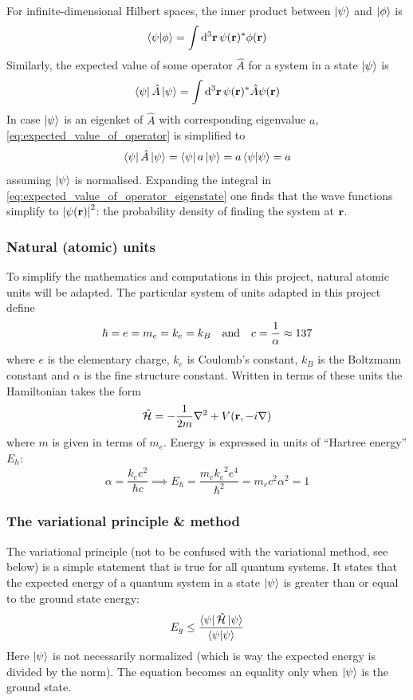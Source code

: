 \documentclass[nofootinbib,reprint,english]{revtex4-1}
\newcommand{\hatHH}{\hat{\mathcal{H}}}
\begin{document}
For infinite-dimensional Hilbert spaces, the inner product between \(\ket{\psi}\) and \(\ket{\phi}\) is
\begin{equation}
\braket{\psi}{\phi}=\int\dd[3]{\vb{r}}\psi(\vb{r})^*\phi(\vb{r})
\end{equation}
Similarly, the expected value of some operator \(\hat{A}\) for a system in a state \(\ket{\psi}\) is
\begin{equation}\label{eq:expected_value_of_operator}
\bra{\psi}\hat{A}\ket{\psi}=\int\dd[3]{\vb{r}}\psi(\vb{r})^*\hat{A}\psi(\vb{r})
\end{equation}
In case \(\ket{\psi}\) is an eigenket of \(\hat{A}\) with corresponding eigenvalue \(a\), \eqref{eq:expected_value_of_operator} is simplified to
\begin{equation}\label{eq:expected_value_of_operator_eigenstate}
\bra{\psi}\hat{A}\ket{\psi}=\bra{\psi}a\ket{\psi}=a\braket{\psi}{\psi}=a
\end{equation}
assuming \(\ket{\psi}\) is normalised. Expanding the integral in \eqref{eq:expected_value_of_operator_eigenstate} one finds that the wave functions simplify to \(\abs{\psi(\vb{r})}^2\): the probability density of finding the system at \(\vb{r}\).
\subsubsection{Natural (atomic) units}
To simplify the mathematics and computations in this project, natural atomic units will be adapted. The particular system of units adapted in this project define
\begin{equation}
\hbar=e=m_e=k_e=k_B\qand c=\frac{1}{\alpha}\approx137
\end{equation}
where \(e\) is the elementary charge, \(k_e\) is Coulomb's constant, \(k_B\) is the Boltzmann constant and \(\alpha\) is the fine structure constant. Written in terms of these units the Hamiltonian takes the form
\begin{equation}
\hatHH=-\frac{1}{2m}\nabla^2+V(\vb{r},-i\nabla)
\end{equation}
where \(m\) is given in terms of \(m_e\). Energy is expressed in units of ``Hartree energy'' \(E_h\):
\[\alpha=\frac{k_ee^2}{\hbar c}\implies E_h=\frac{m_e{k_e}^2e^4}{\hbar^2}=m_ec^2\alpha^2=1\]

\subsubsection{The variational principle \& method}
The variational principle (not to be confused with the variational method, see below) is a simple statement that is true for all quantum systems. It states that the expected energy of a quantum system in a state \(\ket{\psi}\) is greater than or equal to the ground state energy:
\begin{equation}\label{eq:variational_principle}
E_g\leq\frac{\bra{\psi}\hatHH\ket{\psi}}{\braket{\psi}}
\end{equation}
Here \(\ket{\psi}\) is not necessarily normalized (which is way the expected energy is divided by the norm). The equation becomes an equality only when \(\ket{\psi}\) is the ground state. 
\end{document}

